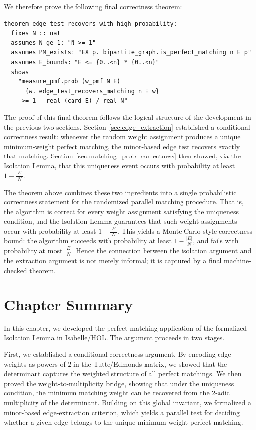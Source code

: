 We therefore prove the following final correctness theorem:

\begin{lstlisting}[language=Isabelle, caption={End-to-end high-probability correctness of edge extraction}]
theorem edge_test_recovers_with_high_probability:
  fixes N :: nat
  assumes N_ge_1: "N >= 1"
  assumes PM_exists: "EX p. bipartite_graph.is_perfect_matching n E p"
  assumes E_bounds: "E <= {0..<n} * {0..<n}"
  shows
    "measure_pmf.prob (w_pmf N E)
      {w. edge_test_recovers_matching n E w}
     >= 1 - real (card E) / real N"
\end{lstlisting}

The proof of this final theorem follows the logical structure of the development in the previous two sections.
Section~\ref{sec:edge_extraction} established a conditional correctness result: whenever the random weight assignment produces a unique minimum-weight perfect matching, the minor-based edge test recovers exactly that matching.
Section~\ref{sec:matching_prob_correctness} then showed, via the Isolation Lemma, that this uniqueness event occurs with probability at least $1 - \frac{|E|}{N}$.

The theorem above combines these two ingredients into a single probabilistic correctness statement for the randomized parallel matching procedure.
That is, the algorithm is correct for every weight assignment satisfying the uniqueness condition, and the Isolation Lemma guarantees that such weight assignments occur with probability at least $1 - \frac{|E|}{N}$.
This yields a Monte Carlo-style correctness bound: the algorithm succeeds with probability at least $1 - \frac{|E|}{N}$, and fails with probability at most $\frac{|E|}{N}$.
Hence the connection between the isolation argument and the extraction argument is not merely informal; it is captured by a final machine-checked theorem.


\section{Chapter Summary}
\label{sec:matching_summary}

In this chapter, we developed the perfect-matching application of the formalized Isolation Lemma in Isabelle/HOL.
The argument proceeds in two stages.

First, we established a conditional correctness argument.
By encoding edge weights as powers of $2$ in the Tutte/Edmonds matrix, we showed that the determinant captures the weighted structure of all perfect matchings.
We then proved the weight-to-multiplicity bridge, showing that under the uniqueness condition, the minimum matching weight can be recovered from the 2-adic multiplicity of the determinant.
Building on this global invariant, we formalized a minor-based edge-extraction criterion, which yields a parallel test for deciding whether a given edge belongs to the unique minimum-weight perfect matching.

